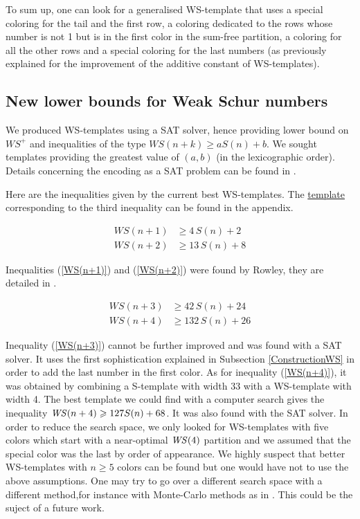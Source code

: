 \par
To sum up, one can look for a generalised WS-template that uses a special coloring for the tail and the first row, a
coloring dedicated to the rows whose number is not 1 but is in the first color in the sum-free partition, a coloring for all
the other rows and a special coloring for the last numbers (as previously explained for the improvement of the additive
constant of WS-templates).

\subsection{New lower bounds for Weak Schur numbers}

We produced WS-templates using a SAT solver, hence providing lower bound on \(WS^+\) and inequalities
of the type \(WS(n+k) \geqslant a S(n) + b\). We sought templates providing the greatest value of \((a, b)\) (in the 
lexicographic order). Details concerning the encoding as a SAT problem can be found in \cite{Heule2017}.

\par
Here are the inequalities given by the current best WS-templates. The \hyperref[WS-templates]{template} 
corresponding to the third inequality can be found in the appendix.

\begin{align}
	WS(n + 1) &\geqslant  4\,S(n)  +  2 \label{WS(n+1)} \\
	WS(n + 2) &\geqslant  13\,S(n)  +  8 \label{WS(n+2)} 
\end{align}

Inequalities (\ref{WS(n+1)}) and (\ref{WS(n+2)}) were found by Rowley, they are detailed in \cite{RowleyWS}.

\begin{align}
	WS(n + 3) &\geqslant  42\,S(n)  +  24 \label{WS(n+3)} \\
	WS(n + 4) &\geqslant  132\,S(n)  +  26 \label{WS(n+4)}
\end{align}

Inequality (\ref{WS(n+3)}) cannot be further improved and was found with a SAT solver. It uses the first 
sophistication explained in Subsection \ref{ConstructionWS} in order to add
the last number in the first color. As for inequality (\ref{WS(n+4)}), it was obtained by combining a S-template with 
width 33 with a WS-template with width 4. The best template we could find with a computer search gives the 
inequality \(\mathit{WS}(n+4) \geqslant 127 S(n) + 68\). It was also found with the SAT solver. In order to reduce the search space, 
we only looked for WS-templates with five colors which start with a near-optimal \(\mathit{WS}(4)\) partition and we assumed that the 
special color was the last by order of appearance. We highly suspect that better WS-templates with \(n \geqslant 5\) 
colors can be found but one would have not to use the above assumptions. One may try to go over a different search space 
with a different method,for instance with Monte-Carlo methods as in \cite{Bouzy2015AnAP}. This could be the suject of a 
future work.

